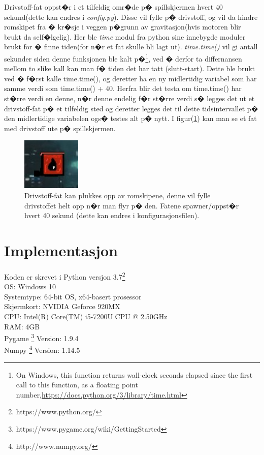 {Drivstoff-fat oppst�r i et tilfeldig omr�de p� spillskjermen hvert 40 sekund(dette kan endres i \emph{config.py}). Disse vil fylle p� drivstoff, og vil da hindre romskipet fra � kr�sje i veggen p�grunn av gravitasjon(hvis motoren blir brukt da self�lgelig). Her ble \emph{time} modul fra python sine innebygde moduler brukt for � finne tiden(for n�r et fat skulle bli lagt ut). \emph{time.time()} vil gi antall sekunder siden denne funksjonen ble kalt p�\footnote{On Windows, this function returns wall-clock seconds elapsed since the first call to this function, as a floating point number,\url{https://docs.python.org/3/library/time.html}}, ved � derfor ta differnansen mellom to slike kall kan man f� tiden det har tatt (slutt-start). Dette ble brukt ved � f�rst kalle time.time(), og deretter ha en ny midlertidig variabel som har samme verdi som time.time() + 40. Herfra blir det testa om time.time() har st�rre verdi en denne, n�r denne endelig f�r st�rre verdi s� legges det ut et drivstoff-fat p� et tilfeldig sted og deretter legges det til dette tidsintervallet p� den midlertidige variabelen ogs� testes alt p� nytt. I figur(\ref{fuel}) kan man se et fat med drivstoff ute p� spillskjermen.


\begin{figure}[hbt!]
    {\centering
        \includegraphics[width=0.25\textwidth]{fuel.jpg}
        \caption{Drivstoff-fat kan plukkes opp av romskipene, denne vil fylle drivstoffet helt opp n�r man flyr p� den. Fatene spawner/oppst�r hvert 40 sekund (dette kan endres i konfigurasjonsfilen).}
        \label{fuel}
    \par}
    \end{figure}


    \newpage
\section{Implementasjon}
    Koden er skrevet i Python versjon 3.7\footnote{https://www.python.org/}\\
    OS: Windows 10\\
    Systemtype: 64-bit OS, x64-basert prosessor\\
    Skjermkort: NVIDIA Geforce 920MX\\
    CPU: Intel(R) Core(TM) i5-7200U CPU @ 2.50GHz\\
    RAM: 4GB\\
    Pygame \footnote{https://www.pygame.org/wiki/GettingStarted} Version: 1.9.4\\
    Numpy \footnote{http://www.numpy.org/} Version: 1.14.5\\
    



}
